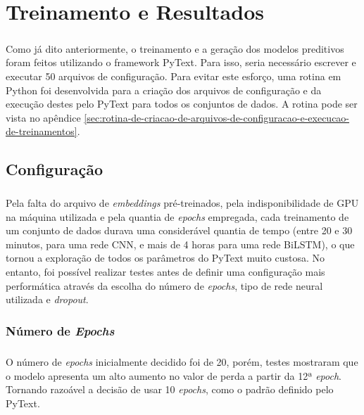 \documentclass[grad,numbers]{coppe}
\begin{document}
  \chapter{Treinamento e Resultados}
	  \paragraph{}Como já dito anteriormente, o treinamento e a geração dos modelos preditivos foram feitos utilizando o framework PyText. Para isso, seria necessário escrever e executar 50 arquivos de configuração. Para evitar este esforço, uma rotina em Python foi desenvolvida para a criação dos arquivos de configuração e da execução destes pelo PyText para todos os conjuntos de dados. A rotina pode ser vista no apêndice \ref{sec:rotina-de-criacao-de-arquivos-de-configuracao-e-execucao-de-treinamentos}.
	  \section{Configuração}
		  \paragraph{}Pela falta do arquivo de \textit{embeddings} pré-treinados, pela indisponibilidade de GPU na máquina utilizada e pela quantia de \textit{epochs} empregada, cada treinamento de um conjunto de dados durava uma considerável quantia de tempo (entre 20 e 30 minutos, para uma rede CNN, e mais de 4 horas para uma rede BiLSTM), o que tornou a exploração de todos os parâmetros do PyText muito custosa. No entanto, foi possível realizar testes antes de definir uma configuração mais performática através da escolha do número de \textit{epochs}, tipo de rede neural utilizada e \textit{dropout}.
		  \subsection{Número de \textit{Epochs}}
		  	\paragraph{}O número de \textit{epochs} inicialmente decidido foi de 20, porém, testes mostraram que o modelo apresenta um alto aumento no valor de perda a partir da 12ª \textit{epoch}. Tornando razoável a decisão de usar 10 \textit{epochs}, como o padrão definido pelo PyText.
\end{document}
